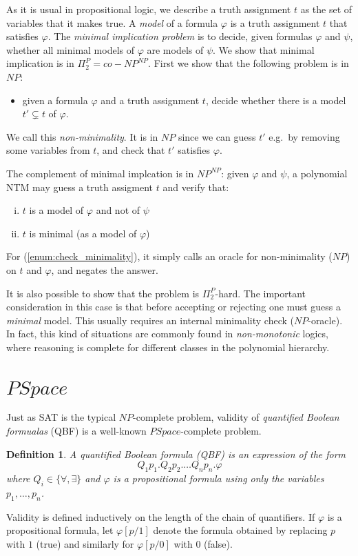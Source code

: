 \documentclass{report}
\newcommand{\NP}{\text{$\mathit{NP}$}}
\newcommand{\Po}{\text{$\mathit{P}$}}
\newtheorem{definition}{Definition}[chapter]
\begin{document}
As it is usual in propositional logic, we describe a truth assignment $t$ as the set of variables that it makes true. A \emph{model} of a formula $\varphi$ is a truth assignment $t$ that satisfies $\varphi$. The \emph{minimal implication problem} is to decide, given formulas $\varphi$ and $\psi$, whether all minimal models of $\varphi$ are models of $\psi$. We show that minimal implication is in $\Pi_2^\Po = co-\NP^\NP$. First we show that the following problem is in $\NP$: 
\begin{itemize}
 \item given a formula $\varphi$ and a truth assignment $t$, decide whether there is a model $t' \subsetneq t$ of $\varphi$. 
\end{itemize}
We call this \emph{non-minimality}. It is in $\NP$ since we can guess $t'$ e.g.\ by removing some variables from $t$, and check that $t'$ satisfies $\varphi$. 

The complement of minimal implcation is in $\NP^\NP$: given $\varphi$ and $\psi$, a polynomial NTM may guess a truth assigment $t$ and verify that:
\begin{enumerate}[(i)]
 \item $t$ is a model of $\varphi$ and not of $\psi$
 \item $t$ is minimal (as a model of $\varphi$) \label{enum:check_minimality}
\end{enumerate}
For (\ref{enum:check_minimality}), it simply calls an oracle for non-minimality ($\NP$) on $t$ and $\varphi$, and negates the answer. 

It is also possible to show that the problem is $\Pi_2^\Po$-hard. The important consideration in this case is that before accepting or rejecting one must guess a \emph{minimal} model. This usually requires an internal minimality check ($\NP$-oracle). In fact, this kind of situations are commonly found in \emph{non-monotonic} logics, where reasoning is complete for different classes in the polynomial hierarchy. 

\section*{$PSpace$}
Just as SAT is the typical $\NP$-complete problem, validity of \emph{quantified Boolean formualas} (QBF) is a well-known $PSpace$-complete problem. 

\begin{definition} A quantified Boolean formula (QBF) is an expression of the form 
\[ Q_1p_1.Q_2p_2. \ldots Q_np_n.\varphi \]
where $Q_i \in \{\forall, \exists\}$ and $\varphi$ is a propositional formula using only the variables $p_1, \ldots, p_n$.   
\end{definition}
Validity is defined inductively on the length of the chain of quantifiers. If $\varphi$ is a propositional formula, let $\varphi[p/1]$ denote the formula obtained by replacing $p$ with $1$ (true) and similarly for $\varphi[p/0]$ with $0$ (false). 
\end{document}
